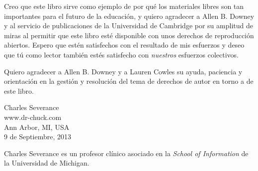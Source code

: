 Creo que este libro sirve como ejemplo de por qué los materiales libres
son tan importantes para el futuro de la educación,
y quiero agradecer a Allen B. Downey y al servicio de publicaciones de
la Universidad de Cambridge por su amplitud de miras al permitir
que este libro esté disponible con unos derechos de reproducción abiertos.
Espero que estén satisfechos con el resultado de mis esfuerzos y deseo
que tú como lector también estés satisfecho con \emph{nuestros}
esfuerzos colectivos.

Quiero agradecer a Allen B. Downey y a Lauren Cowles su ayuda,
paciencia y orientación en la gestión y resolución del tema
de derechos de autor en torno a de este libro.

Charles Severance\\
www.dr-chuck.com\\
Ann Arbor, MI, USA\\
9 de Septiembre, 2013

Charles Severance es un
profesor clínico asociado
en la \emph{School of Information} de la Universidad de Michigan.

\clearemptydoublepage

\begin{latexonly}

\tableofcontents

\clearemptydoublepage

\end{latexonly}

\mainmatter

